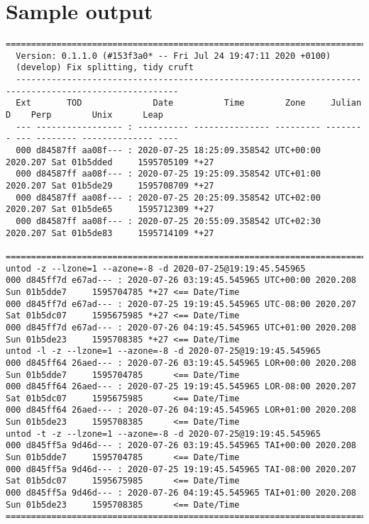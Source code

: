 \documentclass[a4paper,12pt,oneside,openany]{memoir}
\begin{document}
\section{Sample output}
\begin{lstlisting}[style=xtermsmall,
  ]
  ======================================================================================================
  Version: 0.1.1.0 (#153f3a0* -- Fri Jul 24 19:47:11 2020 +0100)
  (develop) Fix splitting, tidy cruft
  ------------------------------------------------------------------------------------------------------
  Ext       TOD              Date          Time        Zone     Julian   D    Perp        Unix      Leap
  --- ----------------- : ---------- --------------- --------- -------- --- -------- -------------- ----
  000 d84587ff aa08f--- : 2020-07-25 18:25:09.358542 UTC+00:00 2020.207 Sat 01b5dded     1595705109 *+27
  000 d84587ff aa08f--- : 2020-07-25 19:25:09.358542 UTC+01:00 2020.207 Sat 01b5de29     1595708709 *+27
  000 d84587ff aa08f--- : 2020-07-25 20:25:09.358542 UTC+02:00 2020.207 Sat 01b5de65     1595712309 *+27
  000 d84587ff aa08f--- : 2020-07-25 20:55:09.358542 UTC+02:30 2020.207 Sat 01b5de83     1595714109 *+27
  ======================================================================================================
untod -z --lzone=1 --azone=-8 -d 2020-07-25@19:19:45.545965
000 d845ff7d e67ad--- : 2020-07-26 03:19:45.545965 UTC+00:00 2020.208 Sun 01b5dde7     1595704785 *+27 <== Date/Time
000 d845ff7d e67ad--- : 2020-07-25 19:19:45.545965 UTC-08:00 2020.207 Sat 01b5dc07     1595675985 *+27 <== Date/Time
000 d845ff7d e67ad--- : 2020-07-26 04:19:45.545965 UTC+01:00 2020.208 Sun 01b5de23     1595708385 *+27 <== Date/Time
untod -l -z --lzone=1 --azone=-8 -d 2020-07-25@19:19:45.545965
000 d845ff64 26aed--- : 2020-07-26 03:19:45.545965 LOR+00:00 2020.208 Sun 01b5dde7     1595704785      <== Date/Time
000 d845ff64 26aed--- : 2020-07-25 19:19:45.545965 LOR-08:00 2020.207 Sat 01b5dc07     1595675985      <== Date/Time
000 d845ff64 26aed--- : 2020-07-26 04:19:45.545965 LOR+01:00 2020.208 Sun 01b5de23     1595708385      <== Date/Time
untod -t -z --lzone=1 --azone=-8 -d 2020-07-25@19:19:45.545965
000 d845ff5a 9d46d--- : 2020-07-26 03:19:45.545965 TAI+00:00 2020.208 Sun 01b5dde7     1595704785      <== Date/Time
000 d845ff5a 9d46d--- : 2020-07-25 19:19:45.545965 TAI-08:00 2020.207 Sat 01b5dc07     1595675985      <== Date/Time
000 d845ff5a 9d46d--- : 2020-07-26 04:19:45.545965 TAI+01:00 2020.208 Sun 01b5de23     1595708385      <== Date/Time
======================================================================================================
\end{lstlisting}
\end{document}
